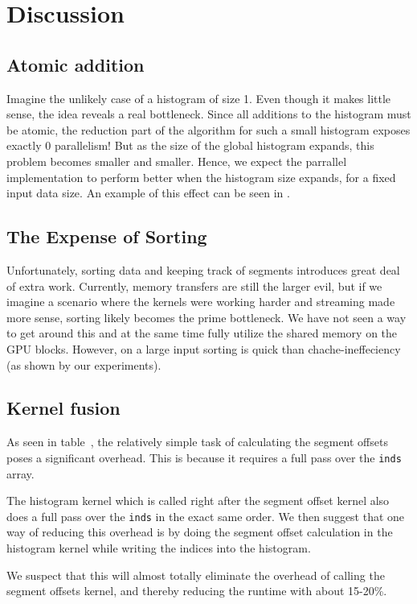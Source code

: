\documentclass[12pt, a4paper, hidelinks]{article}
\renewcommand{\tt}[1]{\texttt{#1}}
\begin{document}
\section{Discussion}

\subsection{Atomic addition}
Imagine the unlikely case of a histogram of size 1. Even though it makes little sense,
the idea reveals a real bottleneck. Since all additions to the
histogram must be atomic, the reduction part of the algorithm for
such a small histogram
exposes exactly 0 parallelism! But as the size of the global histogram
expands, this problem becomes smaller and smaller.
Hence, we expect the parrallel implementation to perform better when the
histogram size expands, for a fixed input data size.
An example of this effect can be seen in .

\subsection{The Expense of Sorting}
Unfortunately, sorting data and keeping track of segments
introduces great deal of extra work. Currently, memory transfers are still the larger evil, but if we imagine a scenario where the kernels were working harder and streaming made more sense, sorting likely becomes the prime bottleneck. We have not seen a way to get around this and at the same time fully utilize the shared memory on the GPU blocks. However, on a large input sorting is quick than chache-ineffeciency (as shown by our experiments).

\subsection{Kernel fusion}
As seen in table~, the relatively simple task of calculating the segment offsets
poses a significant overhead. This is because it requires a full pass over the \tt{inds} array.

The histogram kernel which is called right after the segment offset kernel also does a full
pass over the \tt{inds} in the exact same order. We then suggest that one way of reducing
this overhead is by doing the segment offset calculation in the histogram kernel while
writing the indices into the histogram.

We suspect that this will almost totally eliminate the overhead of calling the segment
offsets kernel, and thereby reducing the runtime with about 15-20\%.
\end{document}
